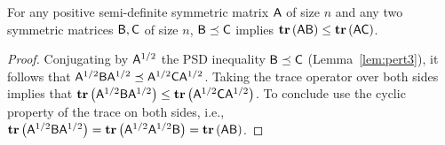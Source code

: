 \begin{lemma}\label{lem:trace:incr_psd}
For any positive semi-definite symmetric matrix $\matA$ of size $n$ and any two symmetric matrices $\matB,\matC$ of size $n$, $\matB\preceq \matC$ implies $\trace{\matA\matB} \leq \trace{\matA\matC}$.
\end{lemma}
\begin{proof}
Conjugating by $\matA^{1/2}$ the PSD inequality $\matB \preceq \matC$ (Lemma~\ref{lem:pert3}), it follows that $\matA^{1/2} \matB \matA^{1/2} \preceq \matA^{1/2} \matC \matA^{1/2}$. Taking the trace operator over both sides implies that $\trace{\matA^{1/2} \matB \matA^{1/2}}  \leq \trace{\matA^{1/2} \matC \matA^{1/2}}$. To conclude use the cyclic property of the trace on both sides, i.e., $\trace{\matA^{1/2} \matB \matA^{1/2}} = \trace{\matA^{1/2} \matA^{1/2} \matB } = \trace{\matA \matB}$.
\end{proof}
%

